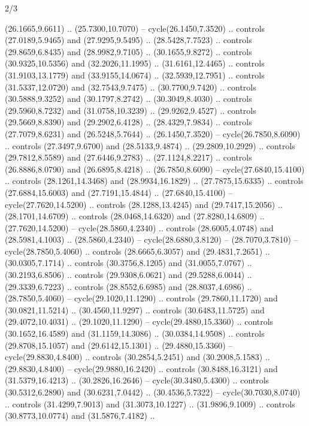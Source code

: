 \begin{flagdescription}{2/3}
\begin{scope}[yshift=\flagwidth,scale=\flagwidth/1241.93737]
\begin{scope}[y=-1mm, x=1mm,draw=gold,fill=blue,line join=miter,miter limit=4,line width=1.8\lw]
\begin{scope}[y=1mm, x=1mm, yscale=-1,shift={(573.68mm+\str,145.75)}]
\begin{scope}[scale=1.35,shift={(-9,-3)}]
\begin{scope}[scale=0.55]
\begin{scope}[scale=1.333]
    (26.1665,9.6611) .. (25.7300,10.7070) -- cycle(26.1450,7.3520) .. controls
    (27.0189,5.9465) and (27.9295,9.5495) .. (28.5428,7.7523) .. controls
    (29.8659,6.8435) and (28.9982,9.7105) .. (30.1655,9.8272) .. controls
    (30.9325,10.5356) and (32.2026,11.1995) .. (31.6161,12.4465) .. controls
    (31.9103,13.1779) and (33.9155,14.0674) .. (32.5939,12.7951) .. controls
    (31.5337,12.0720) and (32.7543,9.7475) .. (30.7700,9.7420) .. controls
    (30.5888,9.3252) and (30.1797,8.2742) .. (30.3049,8.4030) .. controls
    (29.5960,8.7232) and (31.0758,10.3239) .. (29.9262,9.4527) .. controls
    (29.5669,8.8390) and (29.2902,6.4128) .. (28.4329,7.9834) .. controls
    (27.7079,8.6231) and (26.5248,5.7644) .. (26.1450,7.3520) --
    cycle(26.7850,8.6090) .. controls (27.3497,9.6700) and (28.5133,9.4874) ..
    (29.2809,10.2929) .. controls (29.7812,8.5589) and (27.6446,9.2783) ..
    (27.1124,8.2217) .. controls (26.8886,8.0790) and (26.6895,8.4218) ..
    (26.7850,8.6090) -- cycle(27.6840,15.4100) .. controls (28.1261,14.3468) and
    (28.9934,16.1829) .. (27.7875,15.6335) .. controls (27.6884,15.6003) and
    (27.7191,15.4844) .. (27.6840,15.4100) -- cycle(27.7620,14.5200) .. controls
    (28.1288,13.4245) and (29.7417,15.2056) .. (28.1701,14.6709) .. controls
    (28.0468,14.6320) and (27.8280,14.6809) .. (27.7620,14.5200) --
    cycle(28.5860,4.2340) .. controls (28.6005,4.0748) and (28.5981,4.1003) ..
    (28.5860,4.2340) -- cycle(28.6880,3.8120) -- (28.7070,3.7810) --
    cycle(28.7850,5.4060) .. controls (28.6665,6.3057) and (29.4831,7.2651) ..
    (30.0305,7.1714) .. controls (30.3756,8.1205) and (31.0055,7.0767) ..
    (30.2193,6.8506) .. controls (29.9308,6.0621) and (29.5288,6.0044) ..
    (29.3339,6.7223) .. controls (28.8552,6.6985) and (28.8037,4.6986) ..
    (28.7850,5.4060) -- cycle(29.1020,11.1290) .. controls (29.7860,11.1720) and
    (30.0821,11.5214) .. (30.4560,11.9297) .. controls (30.6483,11.5725) and
    (29.4072,10.4031) .. (29.1020,11.1290) -- cycle(29.4880,15.3360) .. controls
    (30.1652,16.4589) and (31.1159,14.3086) .. (30.0384,14.9508) .. controls
    (29.8708,15.1057) and (29.6142,15.1301) .. (29.4880,15.3360) --
    cycle(29.8830,4.8400) .. controls (30.2854,5.2451) and (30.2008,5.1583) ..
    (29.8830,4.8400) -- cycle(29.9880,16.2420) .. controls (30.8488,16.3121) and
    (31.5379,16.4213) .. (30.2826,16.2646) -- cycle(30.3480,5.4300) .. controls
    (30.5312,6.2890) and (30.6231,7.0442) .. (30.4536,5.7322) --
    cycle(30.7030,8.0740) .. controls (31.4299,7.9013) and (31.3073,10.1227) ..
    (31.9896,9.1009) .. controls (30.8773,10.0774) and (31.5876,7.4182) ..

\end{scope}
\end{scope}
\end{scope}
\end{scope}
\end{scope}
\end{scope}
\end{flagdescription}
